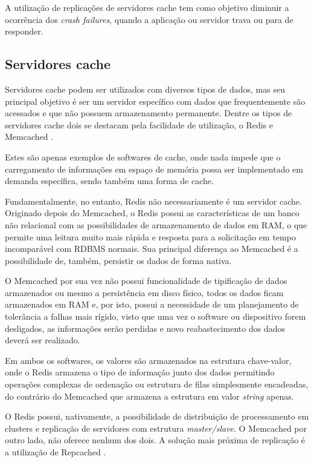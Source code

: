 \documentclass[conference]{IEEEtran}
\begin{document}
A utilização de replicações de servidores cache tem como objetivo diminuir a ocorrência dos \textit{crash failures}, quando a aplicação ou servidor trava ou para de responder. 

\subsection{Servidores cache}

Servidores cache podem ser utilizados com diversos tipos de dados, mas seu principal objetivo é ser um servidor específico com dados que frequentemente são acessados e que não possuem armazenamento permanente. Dentre os tipos de servidores cache dois se destacam pela facilidade de utilização, o Redis e Memcached \cite{memcached}.

Estes são apenas exemplos de softwares de cache, onde nada impede que o carregamento de informações em espaço de memória possa ser implementado em demanda específica, sendo também uma forma de cache.

Fundamentalmente, no entanto, Redis não necessariamente é um servidor cache. Originado depois do Memcached, o Redis possui as características de um banco não relacional com as possibilidades de armazenamento de dados em RAM, o que permite uma leitura muito mais rápida e resposta para a solicitação em tempo incomparável com RDBMS normais. Sua principal diferença ao Memcached é a possibilidade de, também, persistir os dados de forma nativa.

O Memcached por sua vez não possui funcionalidade de tipificação de dados armazenados ou mesmo a persistência em disco físico, todos os dados ficam armazenados em RAM e, por isto, possui a necessidade de um planejamento de tolerância a falhas mais rígido, visto que uma vez o software ou dispositivo forem desligados, as informações serão perdidas e novo reabastecimento dos dados deverá ser realizado.

Em ambos os softwares, os valores são armazenados na estrutura chave-valor, onde o Redis armazena o tipo de informação junto dos dados permitindo operações complexas de ordenação ou estrutura de filas simplesmente encadeadas, do contrário do Memcached que armazena a estrutura em valor \textit{string} apenas.

O Redis possui, nativamente, a possibilidade de distribuição de processamento em clusters e replicação de servidores com estrutura \textit{master/slave}. O Memcached por outro lado, não oferece nenhum dos dois. A solução mais próxima de replicação é a utilização de Repcached \cite{repcached}.
\end{document}
